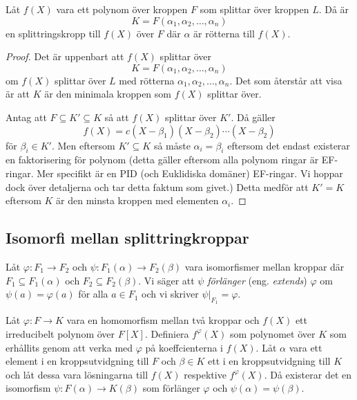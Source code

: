 \documentclass{article}
\theoremstyle{definition}
\begin{document}
\hypertarget{lemma6.0.1}{}
\begin{mylemma}{}{}
  Låt $f(X)$ vara ett polynom över kroppen $F$ som splittar över kroppen $L$. Då är 
  \[K = F(\alpha_1, \alpha_2, \ldots, \alpha_n)\]
  en splittringskropp till $f(X)$ över $F$ där $\alpha$ är rötterna till $f(X)$.
\end{mylemma}

\begin{proof}
  Det är uppenbart att $f(X)$ splittar över 
  \[K = F(\alpha_1, \alpha_2, \ldots, \alpha_n)\]
  om $f(X)$ splittar över $L$ med rötterna $\alpha_1, \alpha_2, \ldots, \alpha_n$. Det som återstår att visa är att 
  $K$ är den minimala kroppen som $f(X)$ splittar över. 

  Antag att $F \subseteq K' \subseteq K$ så att $f(X)$ splittar över $K'$. Då gäller 
  \[f(X) = c(X- \beta_1)(X - \beta_2)\cdots (X - \beta_2)\]
  för $\beta_i \in K'.$ Men eftersom $K' \subseteq K$ så måste $\alpha_i = \beta_i$ eftersom det endast existerar en faktorisering för polynom 
  (detta gäller eftersom alla polynom ringar är EF-ringar. Mer specifikt är en PID (och Euklidiska domäner) EF-ringar. Vi hoppar dock över detaljerna och tar detta 
  faktum som givet.) Detta medför att $K' = K$ eftersom $K$ är den minsta kroppen med elementen $\alpha_i$.
\end{proof}

\subsection{Isomorfi mellan splittringkroppar}
\begin{mydef}{}{}
  Låt $\varphi: F_1 \rightarrow F_2$ och $\psi: F_1(\alpha) \rightarrow F_2(\beta)$ vara isomorfismer mellan kroppar där $F_1 \subseteq F_1(\alpha)$
  och $F_2 \subseteq F_2(\beta)$. 
  Vi säger att $\psi$ \textit{förlänger} (eng. \textit{extends})
  $\varphi$ om $\psi(a) = \varphi(a)$ för alla $a \in F_1$ och vi skriver $\psi |_{F_1} = \varphi.$
\end{mydef}

\hypertarget{6.0.2}{}
\begin{mylemma}{}{}
  Låt $\varphi: F \rightarrow K$ vara en homomorfism mellan två kroppar och $f(X)$ ett irreducibelt polynom över $F[X]$. Definiera $f^{\varphi}(X)$
  som polynomet över $K$ som erhållits genom att verka med $\varphi$ på koeffcienterna i $f(X)$. Låt $\alpha$ vara ett element i en kroppsutvidgning till $F$
  och $\beta \in K$ ett i en kroppsutvidgning till $K$ och låt dessa vara lösningarna till
  $f(X)$ respektive $f^{\varphi}(X)$. Då existerar det en isomorfism $\psi:F(\alpha) \rightarrow K(\beta)$ 
  som förlänger $\varphi$ och $\psi(\alpha) = \psi(\beta).$
\end{mylemma}
\end{document}
